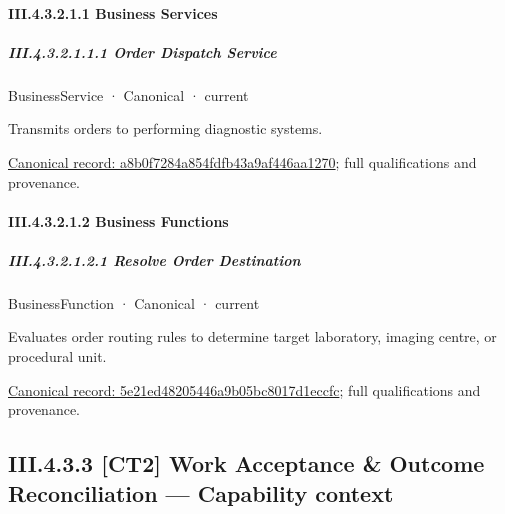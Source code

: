 \paragraph*{III.4.3.2.1.1 Business Services}
\label{navigation:III.4.3.2.1.1}

\subparagraph*{III.4.3.2.1.1.1 Order Dispatch Service}
\label{navigation:III.4.3.2.1.1.1}

\label{element:a8b0f7284a854fdfb43a9af446aa1270}
{\small BusinessService · Canonical · current}\par

Transmits orders to performing diagnostic systems.


{\footnotesize \href{../../../../../../../continuum/business/business-service/a8b0f7284a854fdfb43a9af446aa1270.md}{Canonical record: a8b0f7284a854fdfb43a9af446aa1270}; full qualifications and provenance.}\par
\paragraph*{III.4.3.2.1.2 Business Functions}
\label{navigation:III.4.3.2.1.2}

\subparagraph*{III.4.3.2.1.2.1 Resolve Order Destination}
\label{navigation:III.4.3.2.1.2.1}

\label{element:5e21ed48205446a9b05bc8017d1eccfc}
{\small BusinessFunction · Canonical · current}\par

Evaluates order routing rules to determine target laboratory, imaging centre, or procedural unit.


{\footnotesize \href{../../../../../../../continuum/business/business-function/5e21ed48205446a9b05bc8017d1eccfc.md}{Canonical record: 5e21ed48205446a9b05bc8017d1eccfc}; full qualifications and provenance.}\par
\subsection*{III.4.3.3 [CT2] Work Acceptance \& Outcome Reconciliation — Capability context}
\label{navigation:III.4.3.3}


